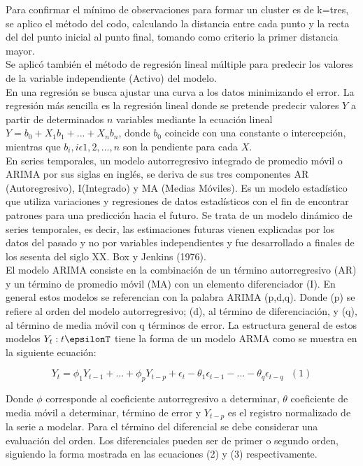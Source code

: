\documentclass{article}
\begin{document}
Para confirmar el mínimo de observaciones para formar un cluster es de k=tres, se aplico el método del codo, calculando la distancia entre cada punto y la recta del del punto inicial al punto final, tomando como criterio la primer distancia mayor.
\\

Se aplicó también el método de regresión lineal múltiple para predecir los valores de la variable independiente (Activo) del modelo.
\\

En una regresión se busca ajustar una curva a los datos minimizando el error. La regresión más sencilla es la regresión lineal donde se pretende predecir valores $Y$ a partir de determinados $n$ variables mediante la ecuación lineal $Y = b_0 + X_1b_1 + ... + X_nb_n$, donde $b_0$ coincide con una constante o intercepción, mientras que $b_i,i \epsilon {1,2,...,n}$ son la pendiente para cada $X$.
\\

En series temporales, un modelo autorregresivo integrado de promedio móvil o ARIMA por sus siglas en inglés, se deriva de sus tres componentes AR (Autoregresivo), I(Integrado) y MA (Medias Móviles). Es un modelo estadístico que utiliza variaciones y regresiones de datos estadísticos con el fin de encontrar patrones para una predicción hacia el futuro. Se trata de un modelo dinámico de series temporales, es decir, las estimaciones futuras vienen explicadas por los datos del pasado y no por variables independientes y fue desarrollado a finales de los sesenta del siglo XX. Box y Jenkins (1976).
\\

El modelo ARIMA consiste en la combinación de un término autorregresivo (AR) y un término de promedio móvil (MA) con un elemento diferenciador (I). En general estos modelos se referencian con la palabra ARIMA (p,d,q). Donde (p) se refiere al orden
del modelo autorregresivo; (d), al término de diferenciación, y (q), al término de media móvil con q términos de error. La estructura general de estos
modelos {$Y_t:t\epsilonT$} tiene la forma de un modelo ARMA
como se muestra en la siguiente ecuación:

$$Y_t = \phi_1Y_{t-1} + ... + \phi_pY_{t-p} + \epsilon_t - \theta_1\epsilon_{t-1} - ... - \theta_q\epsilon_{t-q} \ \ \ (1)$$

Donde $\phi$ corresponde al coeficiente autorregresivo a determinar, $\theta$ coeficiente de media móvil a determinar, \epsilon término de error y $Y_{t-p}$ es el registro normalizado de la serie a modelar. Para el término del diferencial se debe considerar una evaluación del orden. Los diferenciales pueden ser de primer o segundo orden, siguiendo la forma mostrada en las ecuaciones (2) y (3) respectivamente.
\end{document}
